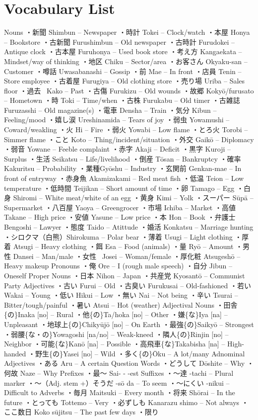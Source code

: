 \section{Vocabulary List}
 Nouns ・新聞 Shimbun – Newspaper ・時計 Tokei – Clock\slash watch ・本屋 Hon\textquotesingle ya – Bookstore ・古新聞 Furushimbun – Old newspaper ・古時計 Furudokei – Antique clock ・古本屋 Furuhon\textquotesingle ya – Used book store ・考え方 Kangaekata – Mindset\slash way of thinking ・地区 Chiku – Sector\slash area ・お客さん Okyaku-san – Customer ・噂話 Uwasabanashi – Gossip ・前 Mae – In front ・店員 Ten\textquotesingle in – Store employee ・古着屋 Furugiya – Old clothing store ・売り場 Uriba – Sales floor ・過去  Kako – Past ・古傷 Furukizu – Old wounds ・故郷 Kokyō\slash furusato – Hometown ・時 Toki – Time\slash when ・古株 Furukabu – Old timer ・古雑誌 Furuzasshi – Old magazine(s) ・電車 Densha – Train ・気分 Kibun – Feeling\slash mood ・嬉し涙 Ureshinamida – Tears of joy ・弱虫 Yowamushi – Coward\slash weakling ・火 Hi – Fire ・弱火 Yowabi – Low flame ・とろ火 Torobi – Simmer flame ・こと Koto – Thing\slash incident\slash situation ・外交 Gaikō – Diplomacy ・弱音 Yowane – Feeble complaint ・赤字 Akaji – Deficit ・黒字 Kuroji – Surplus ・生活 Seikatsu – Life\slash livelihood ・倒産 Tōsan – Bankruptcy ・確率 Kakuritsu – Probability ・業種Gyōshu – Industry ・玄関前 Genkan-mae – In front of entryway ・赤身魚 Akamizakami – Red meat fish ・低温 Teion – Low temperature ・低時間 Teijikan – Short amount of time ・卵 Tamago – Egg ・白身 Shiromi – White meat\slash white of an egg ・黄身 Kimi – Yolk ・スーパー Sūpā – Supermarket ・八百屋 Yaoya – Greengrocer ・市場 Ichiba – Market ・高値 Takane – High price ・安値 Yasune – Low price ・本 Hon – Book ・弁護士 Bengoshi – Lawyer ・態度 Taido – Atittude ・婚活 Konkatsu – Marriage hunting ・シロクマ（白熊）Shirokuma – Polar bear ・薄着 Usugi – Light clothing ・厚着 Atsugi – Heavy clothing ・餌 Esa – Food (animal\textquotesingle s) ・量 Ryō – Amount ・男性 Dansei – Man\slash male ・女性  Josei – Woman\slash female ・厚化粧 Atsugeshō – Heavy makeup Pronouns ・俺 Ore – I (rough male speech) ・自分 Jibun – Oneself Proper Nouns ・日本 Nihon – Japan ・共産党 Kyosantō – Communist Party Adjectives ・古い Furui – Old ・古臭い Furukusai – Old-fashioned ・若い Wakai – Young ・低い Hikui – Low ・無い Nai – Not being ・辛い Tsurai – Bitter\slash tough\slash painful ・暑い Atsui – Hot (weather) Adjectival Nouns ・田舎\{の\}Inaka [no] – Rural ・他\{の\}Ta\slash hoka [no] – Other ・嫌\{な\}Iya [na] – Unpleasant ・地球上\{の\}Chikyūjō [no] – On Earth ・最強\{の\}Saikyō – Strongest ・弱腰\{な・の\}Yowagoshi [na\slash no] – Weak-kneed ・隣人\{の\}Rinjin [no] – Neighbor ・可能\{な\}Kanō [na] – Possible ・高飛車\{な\}Takabisha [na] – High-handed ・野生\{の\}Yasei [no] – Wild ・多く\{の\}Ōku – A lot\slash many Adnominal Adjectives ・ある Aru – A certain Question Words ・どうして Dōshite – Why ・何故 Naze – Why Prefixes ・最～ Sai- - -est Suffixes ・～達 -tachi – Plural marker ・～（Adj. stem +）そうだ -sō da – To seem ・～にくい -nikui – Difficult to Adverbs ・毎月 Maitsuki – Every month ・将来 Shōrai – In the future ・とっても Tottemo – Very ・必ずしも Kanarazu shimo – Not always ・ここ数日 Koko sūjitsu – The past few days ・限り 